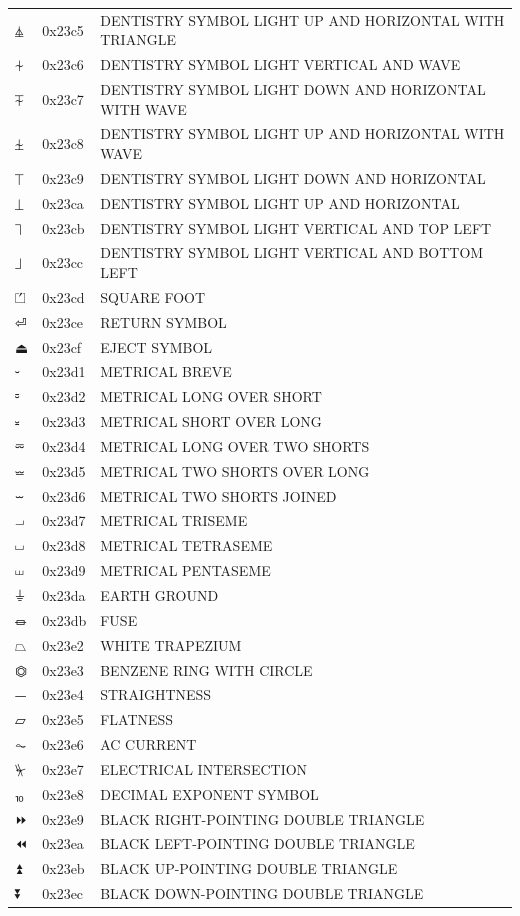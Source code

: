 \documentclass[12pt, twoside]{article}
\begin{document}
\begin{longtable}{L{1.0cm} L{2.0cm} >{\footnotesize}L{10cm}}
$⏅$&0x23c5&DENTISTRY SYMBOL LIGHT UP AND HORIZONTAL WITH TRIANGLE\\
$⏆$&0x23c6&DENTISTRY SYMBOL LIGHT VERTICAL AND WAVE\\
$⏇$&0x23c7&DENTISTRY SYMBOL LIGHT DOWN AND HORIZONTAL WITH WAVE\\
$⏈$&0x23c8&DENTISTRY SYMBOL LIGHT UP AND HORIZONTAL WITH WAVE\\
$⏉$&0x23c9&DENTISTRY SYMBOL LIGHT DOWN AND HORIZONTAL\\
$⏊$&0x23ca&DENTISTRY SYMBOL LIGHT UP AND HORIZONTAL\\
$⏋$&0x23cb&DENTISTRY SYMBOL LIGHT VERTICAL AND TOP LEFT\\
$⏌$&0x23cc&DENTISTRY SYMBOL LIGHT VERTICAL AND BOTTOM LEFT\\
$⏍$&0x23cd&SQUARE FOOT\\
$⏎$&0x23ce&RETURN SYMBOL\\
$⏏$&0x23cf&EJECT SYMBOL\\
$⏑$&0x23d1&METRICAL BREVE\\
$⏒$&0x23d2&METRICAL LONG OVER SHORT\\
$⏓$&0x23d3&METRICAL SHORT OVER LONG\\
$⏔$&0x23d4&METRICAL LONG OVER TWO SHORTS\\
$⏕$&0x23d5&METRICAL TWO SHORTS OVER LONG\\
$⏖$&0x23d6&METRICAL TWO SHORTS JOINED\\
$⏗$&0x23d7&METRICAL TRISEME\\
$⏘$&0x23d8&METRICAL TETRASEME\\
$⏙$&0x23d9&METRICAL PENTASEME\\
$⏚$&0x23da&EARTH GROUND\\
$⏛$&0x23db&FUSE\\
$⏢$&0x23e2&WHITE TRAPEZIUM\\
$⏣$&0x23e3&BENZENE RING WITH CIRCLE\\
$⏤$&0x23e4&STRAIGHTNESS\\
$⏥$&0x23e5&FLATNESS\\
$⏦$&0x23e6&AC CURRENT\\
$⏧$&0x23e7&ELECTRICAL INTERSECTION\\
$⏨$&0x23e8&DECIMAL EXPONENT SYMBOL\\
$⏩$&0x23e9&BLACK RIGHT-POINTING DOUBLE TRIANGLE\\
$⏪$&0x23ea&BLACK LEFT-POINTING DOUBLE TRIANGLE\\
$⏫$&0x23eb&BLACK UP-POINTING DOUBLE TRIANGLE\\
$⏬$&0x23ec&BLACK DOWN-POINTING DOUBLE TRIANGLE\\

\end{longtable}
\end{document}
